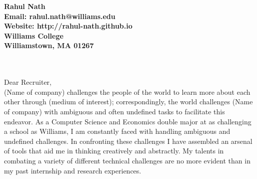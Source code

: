 \documentclass[11pt]{letter} %
\newcommand{\forceindent}{\leavevmode{\parindent=24pt\indent}}
\begin{document}



\begin{center}
\large\bf Rahul Nath \\ %
Email: rahul.nath@williams.edu \\ Website: http://rahul-nath.github.io \\ Williams College \\ Williamstown, MA 01267
\end{center}

\\ \\
Dear Recruiter,\\

\forceindent (Name of company) challenges the people of the world to learn more about each other through (medium of interest); correspondingly, the world challenges (Name of company) with ambiguous and often undefined tasks to facilitate this endeavor. As a Computer Science and Economics double major at as challenging a school as Williams, I am constantly faced with handling ambiguous and undefined challenges. In confronting these challenges I have assembled an arsenal of tools that aid me in thinking creatively and abstractly. My talents in combating a variety of different technical challenges are no more evident than in my past internship and research experiences. \\
\end{document}
